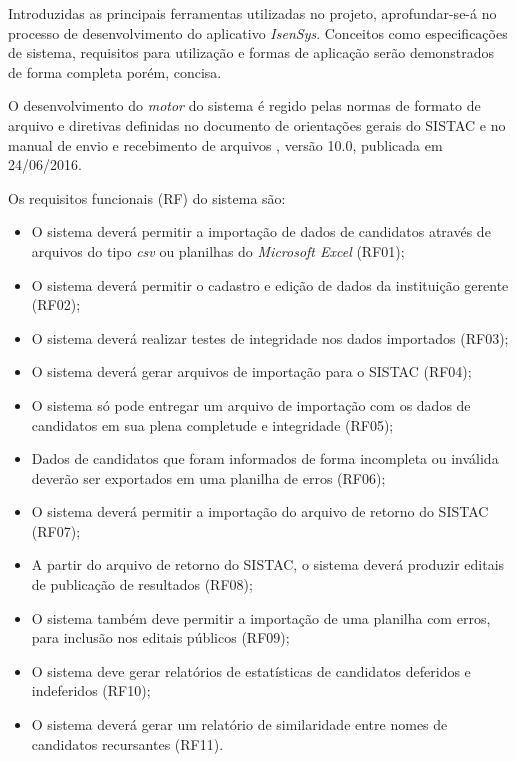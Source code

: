 \documentclass[
	12pt,			%
	openright,		%
	oneside,	
	a4paper,		%
	english,		%
	brazil			%
]{abntex2/abntex2}  %
\begin{document}
		Introduzidas as principais ferramentas utilizadas no projeto, aprofundar-se-á no processo de desenvolvimento do aplicativo \textit{IsenSys}. Conceitos como especificações de sistema, requisitos para utilização e formas de aplicação serão demonstrados de forma completa porém, concisa.
		
		O desenvolvimento do \textit{motor} do sistema é regido pelas normas de formato de arquivo e diretivas definidas no documento de orientações gerais do SISTAC \cite{sistac-gerais} e no manual de envio e recebimento de arquivos \cite{sistac-formatos}, versão 10.0, publicada em 24/06/2016.
		
		Os requisitos funcionais (RF) do sistema são:
	
		\begin{itemize}

			\item O sistema deverá permitir a importação de dados de candidatos através de arquivos do tipo \textit{csv} ou planilhas do \textit{Microsoft Excel} (RF01);
			\item O sistema deverá permitir o cadastro e edição de dados da instituição gerente (RF02);
			\item O sistema deverá realizar testes de integridade nos dados importados (RF03);
			\item O sistema deverá gerar arquivos de importação para o SISTAC (RF04);
			\item O sistema só pode entregar um arquivo de importação com os dados de candidatos em sua plena completude e integridade (RF05);
			\item Dados de candidatos que foram informados de forma incompleta ou inválida deverão ser exportados em uma planilha de erros (RF06);
			\item O sistema deverá permitir a importação do arquivo de retorno do SISTAC (RF07);
			\item A partir do arquivo de retorno do SISTAC, o sistema deverá produzir editais de publicação de resultados (RF08);
			\item O sistema também deve permitir a importação de uma planilha com erros, para inclusão nos editais públicos (RF09);
			\item O sistema deve gerar relatórios de estatísticas de candidatos deferidos e indeferidos (RF10);
			\item O sistema deverá gerar um relatório de similaridade entre nomes de candidatos recursantes (RF11).
			
		\end{itemize}
	
\end{document}
